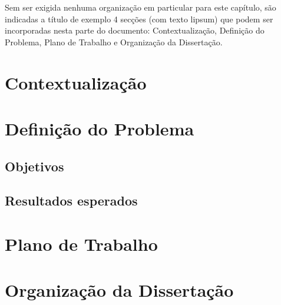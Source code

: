 Sem ser exigida nenhuma organização em particular para este capítulo, são indicadas a título de exemplo 4 secções (com texto \gls{lipsum}) que podem ser incorporadas nesta parte do documento: Contextualização, Definição do Problema, Plano de Trabalho e Organização da Dissertação. 	


\section{Contextualização}
\label{sec:Ch1.1}

\lipsum[1] %


\section{Definição do Problema}
\label{sec:Ch1.2}

\lipsum[2]


\subsection{Objetivos}
\label{sub:Ch1.2.1}

\lipsum[1]


\subsection{Resultados esperados}
\label{sub:Ch1.2.2}

\lipsum[2]


\section{Plano de Trabalho}
\label{sec:Ch1.3}

\lipsum[1]




\section{Organização da Dissertação}
\label{sec:Ch1.4}

\lipsum[2]



